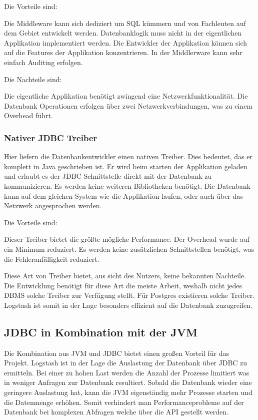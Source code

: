 Die Vorteile sind:

\begin{outline}
  \1 Die Middleware kann sich dediziert um SQL kümmern und von Fachleuten auf
  dem Gebiet entwickelt werden.
  \1 Datenbanklogik muss nicht in der eigentlichen Applikation implementiert
  werden. Die Entwickler der Applikation können sich auf die Features der
  Applikation konzentrieren.
  \1 In der Middlerware kann sehr einfach Auditing erfolgen.
\end{outline}

Die Nachteile sind:

\begin{outline}
  \1 Die eigentliche Applikation benötigt zwingend eine Netzwerkfunktionalität.
  \1 Die Datenbank Operationen erfolgen über zwei Netzwerkverbindungen, was
  zu einem Overhead führt.
\end{outline}

\subsubsection{Nativer JDBC Treiber}
Hier liefern die Datenbankentwickler einen nativen Treiber. Dies bedeutet, das
er komplett in Java geschrieben ist. Er wird beim starten der Applikation
geladen und erlaubt es der JDBC Schnittstelle direkt mit der Datenbank zu
kommunizieren. Es werden keine weiteren Bibliotheken benötigt. Die Datenbank
kann auf dem gleichen System wie die Applikation laufen, oder auch über das
Netzwerk angesprochen werden.

Die Vorteile sind:

\begin{outline}
  \1 Dieser Treiber bietet die größte mögliche Performance.
  \1 Der Overhead wurde auf ein Minimum reduziert.
  \1 Es werden keine zusätzlichen Schnittstellen benötigt, was die
  Fehleranfälligkeit reduziert.
\end{outline}

Diese Art von Treiber bietet, aus sicht des Nutzers, keine bekannten Nachteile.
Die Entwicklung benötigt für diese Art die meiste Arbeit, weshalb nicht jedes
DBMS solche Treiber zur Verfügung stellt. Für Postgres existieren solche
Treiber. Logstash ist somit in der Lage besonders effizient auf die Datenbank
zuzugreifen.
\tm%

\subsection{JDBC in Kombination mit der JVM}
Die Kombination aus JVM und JDBC bietet einen großen Vorteil für das Projekt.
Logstash ist in der Lage die Auslastung der Datenbank über JDBC zu ermitteln.
Bei einer zu hohen Last werden die Anzahl der Prozesse limitiert was in weniger
Anfragen zur Datenbank resultiert. Sobald die Datenbank wieder eine geringere
Auslastung hat, kann die JVM eigenständig mehr Prozesse starten und die
Datenmenge erhöhen. Somit verhindert man Performanceprobleme auf der Datenbank
bei komplexen Abfragen welche über die API gestellt werden.

